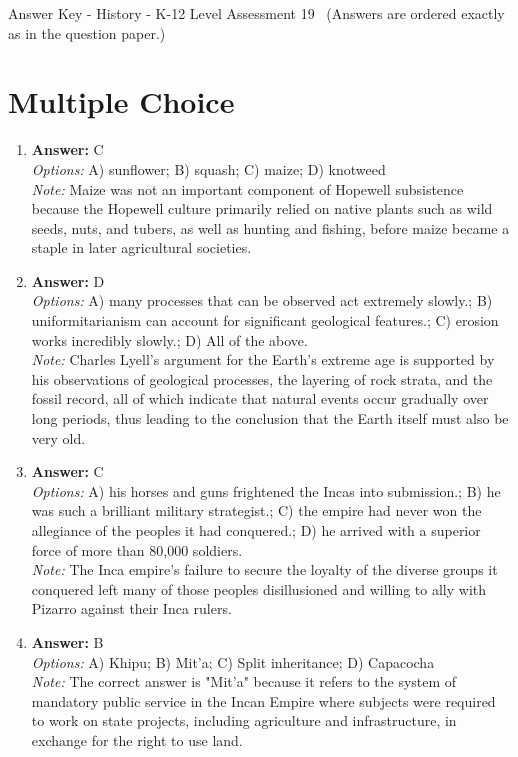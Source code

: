 \documentclass[12pt]{article}
\begin{document}
\begin{center}
Answer Key - History - K-12 Level Assessment 19 \
\small (Answers are ordered exactly as in the question paper.)
\end{center}

\section*{Multiple Choice}
\begin{enumerate}[label=\arabic*.]
\item \textbf{Answer:} C
\\ \textit{Options:} A) sunflower; B) squash; C) maize; D) knotweed
\\ \textit{Note:} Maize was not an important component of Hopewell subsistence because the Hopewell culture primarily relied on native plants such as wild seeds, nuts, and tubers, as well as hunting and fishing, before maize became a staple in later agricultural societies.
\item \textbf{Answer:} D
\\ \textit{Options:} A) many processes that can be observed act extremely slowly.; B) uniformitarianism can account for significant geological features.; C) erosion works incredibly slowly.; D) All of the above.
\\ \textit{Note:} Charles Lyell's argument for the Earth's extreme age is supported by his observations of geological processes, the layering of rock strata, and the fossil record, all of which indicate that natural events occur gradually over long periods, thus leading to the conclusion that the Earth itself must also be very old.
\item \textbf{Answer:} C
\\ \textit{Options:} A) his horses and guns frightened the Incas into submission.; B) he was such a brilliant military strategist.; C) the empire had never won the allegiance of the peoples it had conquered.; D) he arrived with a superior force of more than 80,000 soldiers.
\\ \textit{Note:} The Inca empire's failure to secure the loyalty of the diverse groups it conquered left many of those peoples disillusioned and willing to ally with Pizarro against their Inca rulers.
\item \textbf{Answer:} B
\\ \textit{Options:} A) Khipu; B) Mit'a; C) Split inheritance; D) Capacocha
\\ \textit{Note:} The correct answer is "Mit'a" because it refers to the system of mandatory public service in the Incan Empire where subjects were required to work on state projects, including agriculture and infrastructure, in exchange for the right to use land.

\end{enumerate}
\end{document}
